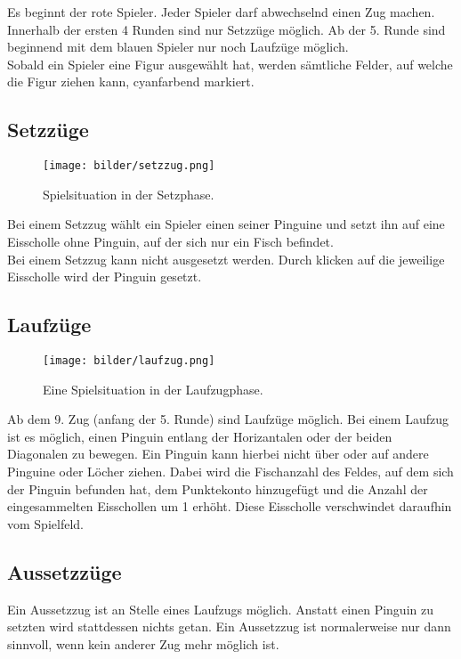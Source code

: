 \documentclass[a4paper, ngerman]{scrartcl}
\begin{document}
	Es beginnt der rote Spieler. Jeder Spieler darf abwechselnd einen
	Zug machen. Innerhalb der ersten 4 Runden sind nur Setzzüge möglich. Ab der
	5.
	Runde sind beginnend mit dem blauen Spieler nur noch Laufzüge möglich.\\
	Sobald ein Spieler eine Figur ausgewählt hat, werden sämtliche Felder, auf
	welche die Figur ziehen kann, cyanfarbend markiert.
	 
	
	
	\subsection{Setzzüge}
	
	\begin{figure}[h!]
		\centering
		\texttt{[image: bilder/setzzug.png]}
		\caption{Spielsituation in der Setzphase.}
		\label{fig:Setzzug}
	\end{figure}
	Bei einem Setzzug wählt ein Spieler einen seiner
	Pinguine und setzt ihn auf eine Eisscholle ohne Pinguin, auf der sich nur ein
	Fisch befindet.\\
	Bei einem Setzzug kann nicht ausgesetzt werden. Durch klicken auf die
	jeweilige Eisscholle wird der Pinguin gesetzt. 
	
	
	 
\subsection{Laufzüge}
	 
	\begin{figure}[h!]
		\centering
		\texttt{[image: bilder/laufzug.png]}
		\caption{Eine Spielsituation in der Laufzugphase.}
		\label{fig:Laufzug}
	\end{figure}
	
Ab dem 9. Zug (anfang der 5. Runde) sind Laufzüge möglich. Bei einem Laufzug
ist es möglich, einen Pinguin entlang der Horizantalen oder der beiden
Diagonalen zu bewegen. Ein Pinguin kann hierbei nicht über oder auf andere Pinguine oder
Löcher ziehen. Dabei wird die Fischanzahl des Feldes, auf dem sich der Pinguin
befunden hat, dem Punktekonto hinzugefügt und die Anzahl der eingesammelten 
Eisschollen um 1 erhöht. Diese Eisscholle verschwindet daraufhin vom Spielfeld.



\subsection{Aussetzzüge}
Ein Aussetzzug ist an Stelle eines Laufzugs möglich. Anstatt einen Pinguin zu 
setzten wird stattdessen nichts getan. Ein Aussetzzug ist normalerweise nur dann
sinnvoll, wenn kein anderer Zug mehr möglich ist.
	
\end{document}
